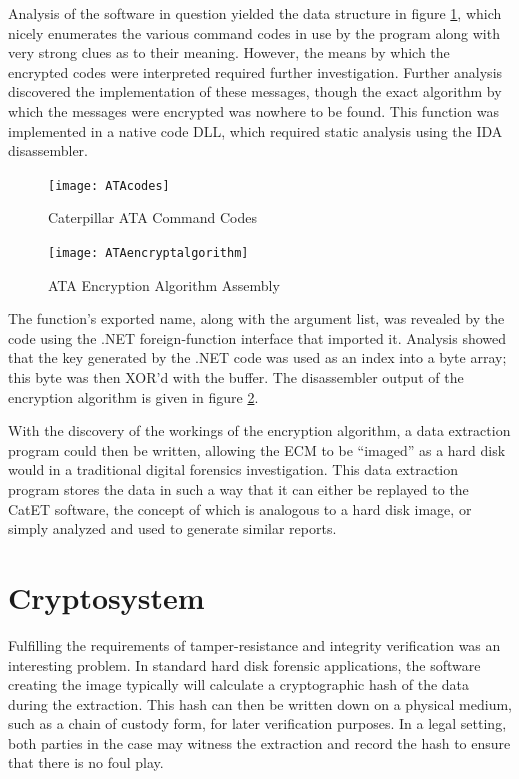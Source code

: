 \documentclass{report}
\begin{document}
Analysis of the software in question yielded the data structure in figure \ref{fig:atacodes}, which nicely enumerates the various command codes in use by the program along with
very strong clues as to their meaning. However, the means by which the encrypted codes were interpreted required further investigation. Further analysis
discovered the implementation of these messages, though the exact algorithm by which the messages were encrypted was nowhere to be found. This function
was implemented in a native code DLL, which required static analysis using the IDA disassembler.

\begin{figure}[h]
  \centering
  \texttt{[image: ATAcodes]}
  \caption{Caterpillar ATA Command Codes}
  \label{fig:atacodes}
\end{figure}

\begin{figure}[h]
  \centering
  \texttt{[image: ATAencryptalgorithm]}
  \caption{ATA Encryption Algorithm Assembly}
  \label{fig:ataalgorithm}
\end{figure}

The function's exported name, along with the argument list, was revealed by the code using the .NET foreign-function interface that imported it. Analysis showed that
the key generated by the .NET code was used as an index into a byte array; this byte was then XOR'd with the buffer. The disassembler output of the encryption
algorithm is given in figure \ref{fig:ataalgorithm}.

With the discovery of the workings of the encryption algorithm, a data extraction program could then be written, allowing the ECM to be ``imaged'' as a hard disk
would in a traditional digital forensics investigation. This data extraction program stores the data in such a way that it can either be replayed to the CatET software,
the concept of which is analogous to a hard disk image, or simply analyzed and used to generate similar reports.

\section{Cryptosystem}

Fulfilling the requirements of tamper-resistance and integrity verification was an interesting problem. In standard hard disk forensic applications, the software
creating the image typically will calculate a cryptographic hash of the data during the extraction. This hash can then be written down on a physical medium, such as
a chain of custody form, for later verification purposes. In a legal setting, both parties in the case may witness the extraction and record the hash to ensure that
there is no foul play.
\end{document}

